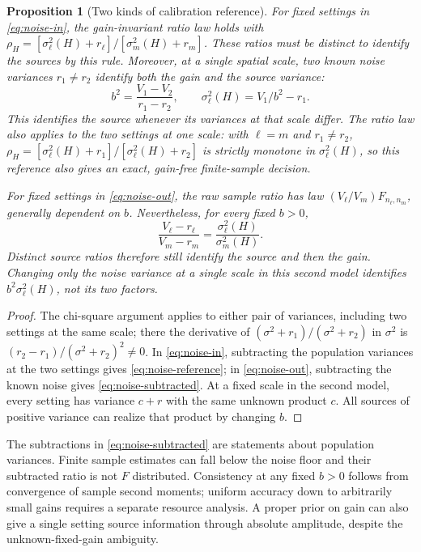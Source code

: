 \documentclass[12pt,a4paper]{article}
\newtheorem{proposition}[theorem]{Proposition}
\begin{document}
\begin{proposition}[Two kinds of calibration reference]\label{prop:noise}
For fixed settings in \eqref{eq:noise-in}, the gain-invariant ratio
law holds with
$\rho_H=[\sigma_\ell^2(H)+r_\ell]/[\sigma_m^2(H)+r_m]$.
These ratios must be distinct to identify the sources by this rule.
Moreover, at a single spatial scale, two known noise variances
$r_1\ne r_2$ identify both the gain and the source variance:
\begin{equation}
 b^2=\frac{V_1-V_2}{r_1-r_2},\qquad
 \sigma_\ell^2(H)=V_1/b^2-r_1.
 \label{eq:noise-reference}
\end{equation}
This identifies the source whenever its variances at that scale differ.
The ratio law also applies to the two settings at one scale: with
$\ell=m$ and $r_1\ne r_2$,
$\rho_H=[\sigma_\ell^2(H)+r_1]/[\sigma_\ell^2(H)+r_2]$ is strictly
monotone in $\sigma_\ell^2(H)$, so this reference also gives an exact,
gain-free finite-sample decision.

For fixed settings in \eqref{eq:noise-out}, the raw sample ratio has
law $(V_\ell/V_m)F_{n_\ell,n_m}$, generally dependent on $b$.
Nevertheless, for every fixed $b>0$,
\begin{equation}
 \frac{V_\ell-r_\ell}{V_m-r_m}
 =\frac{\sigma_\ell^2(H)}{\sigma_m^2(H)}.
 \label{eq:noise-subtracted}
\end{equation}
Distinct source ratios therefore still identify the source and then
the gain. Changing only the noise variance at a single scale in this
second model identifies $b^2\sigma_\ell^2(H)$, not its two factors.
\end{proposition}
\begin{proof}
The chi-square argument applies to either pair of variances, including
two settings at the same scale; there the derivative of
$(\sigma^2+r_1)/(\sigma^2+r_2)$ in $\sigma^2$ is
$(r_2-r_1)/(\sigma^2+r_2)^2\ne0$. In
\eqref{eq:noise-in}, subtracting the population variances at the two
settings gives \eqref{eq:noise-reference}; in
\eqref{eq:noise-out}, subtracting the known noise gives
\eqref{eq:noise-subtracted}. At a fixed scale in the second model,
every setting has variance $c+r$ with the same unknown product $c$.
All sources of positive variance can realize that product by changing
$b$.
\end{proof}

The subtractions in \eqref{eq:noise-subtracted} are statements about
population variances. Finite sample estimates can fall below the
noise floor and their subtracted ratio is not $F$ distributed.
Consistency at any fixed $b>0$ follows from convergence of sample
second moments; uniform accuracy down to arbitrarily small gains
requires a separate resource analysis. A proper prior on gain can
also give a single setting source information through absolute
amplitude, despite the unknown-fixed-gain ambiguity.
\end{document}
